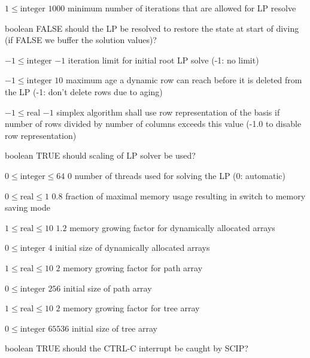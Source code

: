 %
{$1\leq\textrm{integer}$}%
{$1000$}%
{minimum number of iterations that are allowed for LP resolve}%
{}

%
{boolean}%
{FALSE}%
{should the LP be resolved to restore the state at start of diving (if FALSE we buffer the solution values)?}%
{}

%
{$-1\leq\textrm{integer}$}%
{$-1$}%
{iteration limit for initial root LP solve (-1: no limit)}%
{}

%
{$-1\leq\textrm{integer}$}%
{$10$}%
{maximum age a dynamic row can reach before it is deleted from the LP (-1: don't delete rows due to aging)}%
{}

%
{$-1\leq\textrm{real}$}%
{$-1$}%
{simplex algorithm shall use row representation of the basis if number of rows divided by number of columns exceeds this value (-1.0 to disable row representation)}%
{}

%
{boolean}%
{TRUE}%
{should scaling of LP solver be used?}%
{}

%
{$0\leq\textrm{integer}\leq64$}%
{$0$}%
{number of threads used for solving the LP (0: automatic)}%
{}

%
{$0\leq\textrm{real}\leq1$}%
{$0.8$}%
{fraction of maximal memory usage resulting in switch to memory saving mode}%
{}

%
{$1\leq\textrm{real}\leq10$}%
{$1.2$}%
{memory growing factor for dynamically allocated arrays}%
{}

%
{$0\leq\textrm{integer}$}%
{$4$}%
{initial size of dynamically allocated arrays}%
{}

%
{$1\leq\textrm{real}\leq10$}%
{$2$}%
{memory growing factor for path array}%
{}

%
{$0\leq\textrm{integer}$}%
{$256$}%
{initial size of path array}%
{}

%
{$1\leq\textrm{real}\leq10$}%
{$2$}%
{memory growing factor for tree array}%
{}

%
{$0\leq\textrm{integer}$}%
{$65536$}%
{initial size of tree array}%
{}

%
{boolean}%
{TRUE}%
{should the CTRL-C interrupt be caught by SCIP?}%
{}

